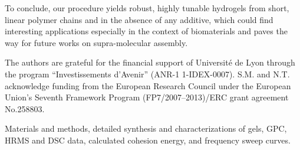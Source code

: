 \documentclass[journal=jacsat,manuscript=article]{achemso}
\begin{document}
To conclude, our procedure yields robust, highly tunable hydrogels from short, linear polymer chains and in the absence of any additive, which could find interesting applications especially in the context of biomaterials and paves the way for future works on supra-molecular assembly.

\begin{acknowledgement}
The authors are grateful for the financial support of Université de Lyon through the program ``Investissements d'Avenir'' (ANR-1 1-IDEX-0007). S.M. and N.T. acknowledge funding from the European Research Council under the European Union's Seventh Framework Program (FP7/2007–2013)/ERC grant agreement No.258803.
\end{acknowledgement}

\begin{suppinfo}

Materials and methods, detailed synthesis and characterizations of gels, GPC, HRMS and DSC data, calculated cohesion energy, and frequency sweep curves.

\end{suppinfo}


\end{document}
